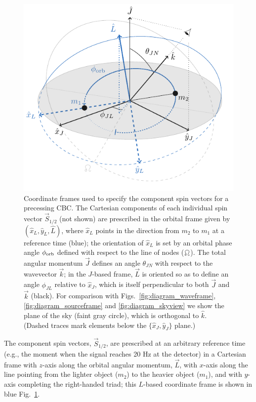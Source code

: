 \documentclass[aps,prd,twocolumn,superscriptaddress,preprintnumbers,floatfix,nofootinbib]{revtex4-2}
\begin{document}
\begin{figure}
\includegraphics[width=0.8\columnwidth]{diagram_spins.pdf}
\caption{Coordinate frames used to specify the component spin vectors for a precessing \ac{CBC}. The Cartesian components of each individual spin vector $\vec{S}_{1/2}$ (not shown) are prescribed in the orbital frame given by $(\hat{x}_L, \hat{y}_L, \hat{L})$, where $\hat{x}_L$ points in the direction from $m_2$ to $m_1$ at a reference time (blue); the orientation of $\hat{x}_L$ is set by an orbital phase angle $\phi_{\rm orb}$ defined with respect to the line of nodes ($\ascnode$).
The total angular momentum $\vec{J}$ defines an angle $\theta_{JN}$ with respect to the wavevector $\vec{k}$; in the $J$-based frame, $\vec{L}$ is oriented so as to define an angle $\phi_{JL}$ relative to $\hat{x}_J$, which is itself perpendicular to both $\vec{J}$ and $\vec{k}$ (black). For comparison with Figs.~\ref{fig:diagram_waveframe}, \ref{fig:diagram_sourceframe} and \ref{fig:diagram_skyview} we show the plane of the sky (faint gray circle), which is orthogonal to $\hat{k}$.
(Dashed traces mark elements below the $\{\hat{x}_J, \hat{y}_J\}$ plane.)}
\label{fig:spins}
\end{figure}

The component spin vectors, $\vec{S}_{1/2}$, are prescribed at an arbitrary reference time (e.g., the moment when the signal reaches 20 Hz at the detector) in a Cartesian frame with $z$-axis along the orbital angular momentum, $\vec{L}$, with $x$-axis along the line pointing from the lighter object ($m_2$) to the heavier object ($m_1$), and with $y$-axis completing the right-handed triad; this $L$-based coordinate frame is shown in blue Fig.~\ref{fig:spins}.
\end{document}
